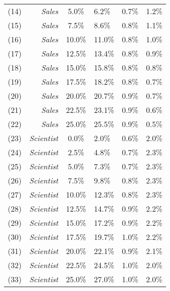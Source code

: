 \begin{supptable}[htb!]
\begin{center}
\begin{tabular}{lrcllc}
(14) & \emph{Sales} & 5.0\% & 6.2\% & 0.7\% & 1.2\% \\
(15) & \emph{Sales} & 7.5\% & 8.6\% & 0.8\% & 1.1\% \\
(16) & \emph{Sales} & 10.0\% & 11.0\% & 0.8\% & 1.0\% \\
(17) & \emph{Sales} & 12.5\% & 13.4\% & 0.8\% & 0.9\% \\
(18) & \emph{Sales} & 15.0\% & 15.8\% & 0.8\% & 0.8\% \\
(19) & \emph{Sales} & 17.5\% & 18.2\% & 0.8\% & 0.7\% \\
(20) & \emph{Sales} & 20.0\% & 20.7\% & 0.9\% & 0.7\% \\
(21) & \emph{Sales} & 22.5\% & 23.1\% & 0.9\% & 0.6\% \\
(22) & \emph{Sales} & 25.0\% & 25.5\% & 0.9\% & 0.5\% \\
\cmidrule{1-6}
(23) & \emph{Scientist} & 0.0\% &  2.0\% & 0.6\% & 2.0\% \\
(24) & \emph{Scientist} & 2.5\% &  4.8\% & 0.7\% & 2.3\% \\
(25) & \emph{Scientist} & 5.0\% &  7.3\% & 0.7\% & 2.3\% \\
(26) & \emph{Scientist} & 7.5\% &  9.8\% & 0.8\% & 2.3\% \\
(27) & \emph{Scientist} & 10.0\% & 12.3\% & 0.8\% & 2.3\% \\
(28) & \emph{Scientist} & 12.5\% & 14.7\% & 0.9\% & 2.2\% \\
(29) & \emph{Scientist} & 15.0\% & 17.2\% & 0.9\% & 2.2\% \\
(30) & \emph{Scientist} & 17.5\% & 19.7\% & 1.0\% & 2.2\% \\
(31) & \emph{Scientist} & 20.0\% & 22.1\% & 0.9\% & 2.1\% \\
(32) & \emph{Scientist} & 22.5\% & 24.5\% & 1.0\% & 2.0\% \\
(33) & \emph{Scientist} & 25.0\% & 27.0\% & 1.0\% & 2.0\% \\
\cmidrule[\heavyrulewidth]{1-6}
\end{tabular}
\end{center}
\vspace{-5mm}
\end{supptable}
